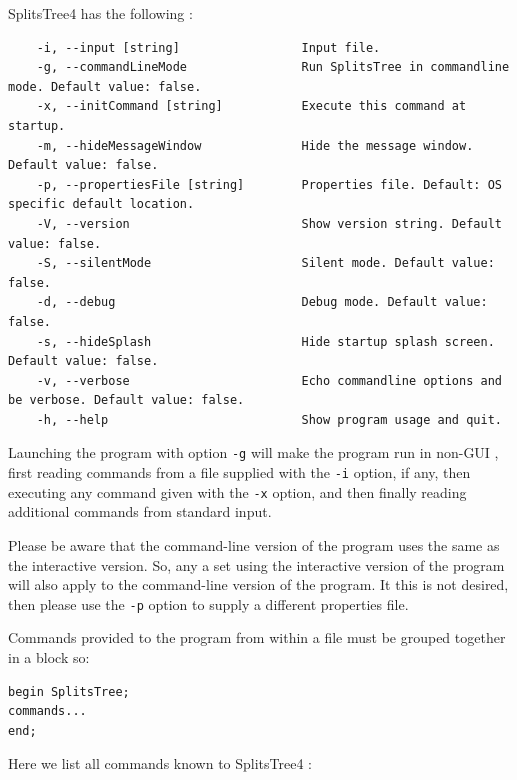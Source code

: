 \documentclass[11pt]{article}
\def\SplitsTree{{\sf SplitsTree4 }}
\begin{document}

\SplitsTree has the following :

\begin{verbatim}
	-i, --input [string]                 Input file. 
	-g, --commandLineMode                Run SplitsTree in commandline mode. Default value: false.
	-x, --initCommand [string]           Execute this command at startup. 
	-m, --hideMessageWindow              Hide the message window. Default value: false.
	-p, --propertiesFile [string]        Properties file. Default: OS specific default location.
	-V, --version                        Show version string. Default value: false.
	-S, --silentMode                     Silent mode. Default value: false.
	-d, --debug                          Debug mode. Default value: false.
	-s, --hideSplash                     Hide startup splash screen. Default value: false.
	-v, --verbose                        Echo commandline options and be verbose. Default value: false.
	-h, --help                           Show program usage and quit.
\end{verbatim}

Launching the program with option {\tt -g} will make the program run
in non-GUI , first reading commands from a file
supplied with the {\tt -i} option, if any, then executing any
command given with the {\tt -x} option, and then finally reading
additional commands from standard input.

Please be aware that the command-line version of the program uses the same
 as the interactive version.
So, any a  set using
the interactive version of the program will also apply to the command-line
version of the program. It this is not desired, then please use the {\tt -p}
option to supply a different properties file.

Commands provided to the program from within a file must be grouped
together in a  block so:
\begin{verbatim}
begin SplitsTree;
commands...
end;
\end{verbatim}

Here we list all commands known to \SplitsTree:
\end{document}
